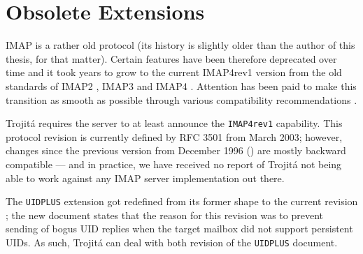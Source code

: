 \documentclass[trojita]{subfiles}
\begin{document}
\section{Obsolete Extensions}

IMAP is a rather old protocol (its history is slightly older than the author of this thesis, for that matter).  Certain
features have been therefore deprecated over time and it took years to grow to the current IMAP4rev1 version from the
old standards of IMAP2 \cite{rfc1064} \cite{rfc1176}, IMAP3 \cite{rfc1203} and IMAP4 \cite{rfc1730}.  Attention has been
paid to make this transition as smooth as possible through various compatibility recommendations \cite{rfc1732}
\cite{rfc2060} \cite{rfc2061} \cite{rfc2062}.

Trojitá requires the server to at least announce the {\tt IMAP4rev1} capability.  This protocol revision is currently
defined by RFC 3501 \cite{rfc3501} from March 2003; however, changes since the previous version from December 1996
(\cite{rfc2060}) are mostly backward compatible --- and in practice, we have received no report of Trojitá not being
able to work against any IMAP server implementation out there.

The {\tt UIDPLUS} extension got redefined from its former shape \cite{rfc2359} to the current revision \cite{rfc4315};
the new document states that the reason for this revision was to prevent sending of bogus UID replies when the target
mailbox did not support persistent UIDs.  As such, Trojitá can deal with both revision of the {\tt UIDPLUS} document.
\end{document}
